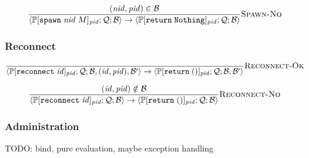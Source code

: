 \documentclass{article}
\newcommand{\sReturn}{\mathtt{return}}
\newcommand{\sSpawn}{\mathtt{spawn}}
\newcommand{\sReconnect}{\mathtt{reconnect}}
\newcommand{\sPid}{\ensuremath{\mathit{pid}}}
\newcommand{\sNid}{\ensuremath{\mathit{nid}}}
\newcommand{\sSystem}[3]{\left\langle #1 ; #2 ; #3 \right\rangle}
\newcommand{\sQueue}{\mathcal{Q}}
\newcommand{\sBlacklist}{\mathcal{B}}
\newcommand{\sNothing}{\mathtt{Nothing}}
\newcommand{\sCtxt}[1]{\mathbb{#1}}
\begin{document}
\begin{equation*}
\frac{
  (\sNid, \sPid) \in \sBlacklist
}{
  \sSystem{\sCtxt{P}[ \sSpawn \; \sNid \; M ]_\sPid}
          {\sQueue}
          {\sBlacklist}
\rightarrow          
  \sSystem{\sCtxt{P}[ \sReturn \; \sNothing ]_\sPid}
          {\sQueue}
          {\sBlacklist}
} \textsc{Spawn-No}
\end{equation*}

\subsubsection{Reconnect}

\begin{equation*}
\frac{
}{
  \sSystem{\sCtxt{P}[ \sReconnect \; \mathit{id} ]_\sPid}
          {\sQueue}
          {\sBlacklist, (\mathit{id}, \sPid), \sBlacklist'}
\rightarrow
  \sSystem{\sCtxt{P}[ \sReturn \; () ]_\sPid}
          {\sQueue}
          {\sBlacklist, \sBlacklist'}
} \textsc{Reconnect-Ok}
\end{equation*}

\begin{equation*}
\frac{
  (\mathit{id}, \sPid) \notin \sBlacklist
}{
  \sSystem{\sCtxt{P}[ \sReconnect \; \mathit{id} ]_\sPid}
          {\sQueue}
          {\sBlacklist}
\rightarrow
  \sSystem{\sCtxt{P}[ \sReturn \; () ]_\sPid}
          {\sQueue}
          {\sBlacklist}
} \textsc{Reconnect-No}
\end{equation*}

\subsubsection{Administration}

TODO: bind, pure evaluation, maybe exception handling
\end{document}
